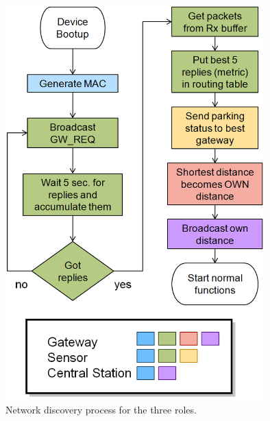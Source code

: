 \begin{figure}
    \centering
    \includegraphics[width=10cm]{images/Flowchart_NetworkDiscovery.png}
	\vspace{-1.5em}
    \caption{Network discovery process for the three roles.}
    \vspace{-1.5em}
    \label{fig:network_discovery}
\end{figure}

